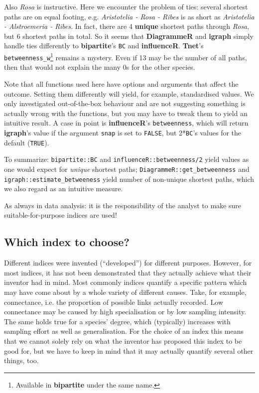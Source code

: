 \documentclass[a4paper, 11pt]{article}\usepackage[]{graphicx}\usepackage[]{color}
\newcommand{\package}[1]{\textbf{#1}}
\newcommand{\code}[1]{\texttt{#1}}
\begin{document}
Also \emph{Rosa} is instructive. Here we encounter the problem of ties: several shortest paths are on equal footing, e.g. \emph{Aristotelia - Rosa - Ribes} is as short as \emph{Aristotelia - Alstroemeria - Ribes}. In fact, there are 4 \textbf{unique} shortest paths through \emph{Rosa}, but 6 shortest paths in total. So it seems that \package{DiagrammeR} and \package{igraph} simply handle ties differently to \package{bipartite}'s \code{BC} and \package{influenceR}. \package{Tnet}'s \code{betweenness\_w}\footnote{Available in \package{bipartite} under the same name.} remains a mystery. Even if 13 may be the number of all paths, then that would not explain the many 0s for the other species.

Note that all functions used here have options and arguments that affect the outcome. Setting them differently will yield, for example, standardised values. We only investigated out-of-the-box behaviour and are not suggesting something is actually wrong with the functions, but you may have to tweak them to yield an intuitive result. A case in point is \package{influenceR}'s \code{betweenness}, which will return \package{igraph}'s value if the argument \texttt{snap} is set to \code{FALSE}, but 2*\code{BC}'s values for the default (\code{TRUE}).

To summarize: \code{bipartite::BC} and \code{influenceR::betweenness/2} yield values as one would expect for \emph{unique} shortest paths; \code{DiagrammeR::get\_betweenness} and \code{igraph::estimate\_betweeness} yield number of non-unique shortest paths, which we also regard as an intuitive measure. 

As always in data analysis: it is the responsibility of the analyst to make sure suitable-for-purpose indices are used!


\subsection{Which index to choose?}%
Different indices were invented (``developed'') for different purposes. However, for most indices, it has not been demonstrated that they actually achieve what their inventor had in mind. Most commonly indices quantify a specific pattern which may have come about by a whole variety of different causes. Take, for example, connectance, i.e. the proportion of possible links actually recorded. Low connectance may be caused by high specialisation or by low sampling intensity. The same holds true for a species' degree, which (typically) increases with sampling effort as well as generalisation. For the choice of an index this means that we cannot solely rely on what the inventor has proposed this index to be good for, but we have to keep in mind that it may actually quantify several other things, too.
\end{document}
